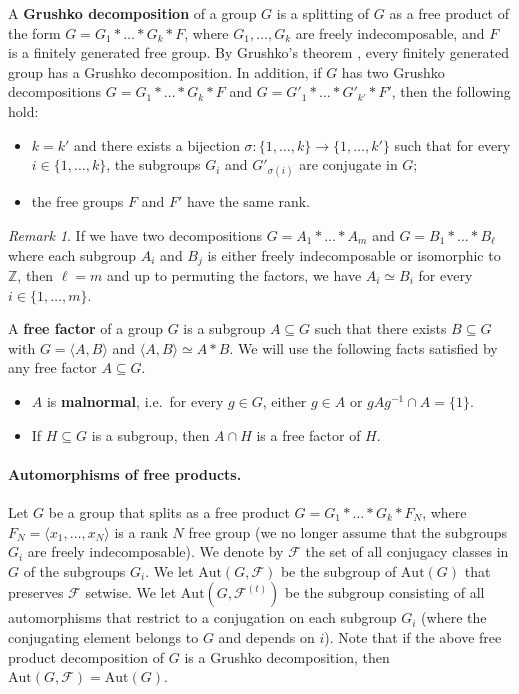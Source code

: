 \documentclass[a4paper,english,11pt]{article}
\theoremstyle{definition}
\theoremstyle{remark}
\newtheorem{rk}[de]{Remark}
\newcommand{\Aut}{\mathrm{Aut}}
\newcommand{\calf}{\mathcal{F}}
\newcommand{\deffont}[1]{\textbf{#1}}
\begin{document}
A \deffont{Grushko decomposition} of a group $G$ is a splitting of $G$ as a free product of the form $G=G_1\ast\dots\ast G_k\ast F$, where $G_1,\dots,G_k$ are freely indecomposable, and $F$ is a finitely generated free group. By Grushko's theorem \cite{Gru}, every finitely generated group has a Grushko decomposition. In addition, if $G$ has two Grushko decompositions $G=G_1\ast\dots\ast G_k\ast F$ and $G=G'_1\ast\dots\ast G'_{k'}\ast F'$, then the following hold:
\begin{itemize}
\item $k=k'$ and there exists a bijection $\sigma:\{1,\dots,k\}\to\{1,\dots,k'\}$ such that for every $i\in\{1,\dots,k\}$, the subgroups $G_i$ and $G'_{\sigma(i)}$ are conjugate in $G$;
\item the free groups $F$ and $F'$ have the same rank.
\end{itemize}
\begin{rk}\label{rk:grushko}
  If we have two decompositions $G=A_1\ast\dots\ast A_m$ and $G=B_1\ast\dots\ast B_\ell$ where each subgroup $A_i$ and $B_j$ is either freely indecomposable or isomorphic to $\mathbb{Z}$, then $\ell=m$ and up to permuting the factors, we have $A_i\simeq B_i$ for every $i\in\{1,\dots,m\}$.
\end{rk}

A \deffont{free factor} of a group $G$ is a subgroup $A\subseteq G$ such that there exists $B\subseteq G$ with $G=\langle A,B\rangle$ and $\langle A,B\rangle\simeq A\ast B$. We will use the following facts satisfied by any free factor $A\subseteq G$.
\begin{itemize}
\item $A$ is \deffont{malnormal}, i.e.\ for every $g\in G$, either $g\in A$ or $gAg^{-1}\cap A=\{1\}$. \label{Def:Malnormal}
\item If $H\subseteq G$ is a subgroup, then $A\cap H$ is a free factor of $H$.
\end{itemize}

\paragraph*{Automorphisms of free products.} Let $G$ be a group that splits as a free product $G=G_1\ast\dots\ast G_k\ast F_N$, where $F_N=\langle x_1,\dots,x_N\rangle$ is a rank $N$ free group (we no longer assume that the subgroups $G_i$ are freely indecomposable). We denote by $\mathcal{F}$ the set of all conjugacy classes in $G$ of the subgroups $G_i$. We let $\Aut(G,\calf)$ be the subgroup of $\Aut(G)$ that preserves $\calf$ setwise. We let $\Aut(G,\calf^{(t)})$ be the subgroup consisting of all automorphisms that restrict to a conjugation on each subgroup $G_i$ (where the conjugating element belongs to $G$ and depends on $i$). Note that if the above free product decomposition of $G$ is a Grushko decomposition, then $\Aut(G,\calf)=\Aut(G)$.
\end{document}
